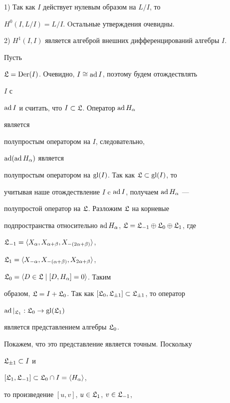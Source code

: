 \begin{pf} 1) Так как $I$ действует нулевым образом на $L/I$, то 


$H^0(I,L/I)=L/I$. Oстальные утверждения очевидны. 


 


2) $H^1(I,I)$ является алгеброй внешних дифференцирований алгебры $I$. 


Пусть 


$\frak L=\operatorname{Der}(I)$. Очевидно, $I\cong\operatorname{ad} I$, поэтому будем отождествлять 


$I$ с 


$\operatorname{ad} I$ и считать, что $I\subset\frak{L}$. Оператор $\operatorname{ad} H_{\alpha}$ 


является 


полупростым оператором на $I$, следовательно, 


$\operatorname{ad}(\operatorname{ad} H_{\alpha})$ является 


полупростым оператором на $\gl (I)$. Так как $\frak {L}\subset \gl 


(I)$, то 


учитывая наше отождествление $I$ c $\operatorname{ad} I$, получаем $\operatorname{ad} H_{\alpha}$ --- 


полупростой оператор на $\frak L$. Разложим $\frak L$ на корневые 


подпространства относительно $\ad H_{\a}$, $\frak L=\frak L_{-1}\oplus 


\frak L_0\oplus \frak L_1$, где 


$\frak L_{-1}=\langle X_{\alpha}, X_{\alpha+\beta}, X_{-(2\alpha+\beta)}\rangle$, 


$\frak L_1=\langle X_{-\alpha}, X_{-(\alpha+\beta)}, X_{2\alpha+\beta}\rangle$, 


$\frak L_{0}=\langle D\in \frak L \mid [D,H_{\alpha}]=0 \rangle$. Таким 


образом, $\frak L=I+\frak L_0$. Так как $[\frak L_0,\frak 


L_{\pm1}]\subset \frak L_{\pm1}$, то оператор 


$\operatorname{ad}\vert_{\frak L_1}:\frak L_{0}\to \operatorname{gl}(\frak L_{1})$ 


является представлением алгебры $\frak L_0$. 


Покажем, что это представление является точным. Поскольку 


$\frak L_{\pm1} \subset I$ и 


$[\frak L_1,\frak L_{-1}]\subset \frak L_{0} \cap I=\langle 


H_{\a}\rangle$, 


то произведение $[u,v]$, $u\in \frak L_1$, $v\in \frak L_{-1}$,



\end{pf}

